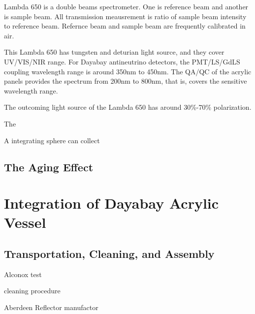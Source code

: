 Lambda 650 is a double beams spectrometer. One is reference beam and another is
sample beam. All transmission meausrement is ratio of sample beam intensity to
reference beam. Refernce beam and sample beam are frequently calibrated in air.

This Lambda 650 has tungsten and deturian light source, and they cover UV/VIS/NIR
range. For Dayabay antineutrino detectors, the PMT/LS/GdLS coupling wavelength range
is around 350nm to 450nm. The QA/QC of the acrylic panels provides the spectrum
from 200nm to 800nm, that is, covers the sensitive wavelength range.

The outcoming light source of the Lambda 650 has around 30\%-70\% polarization.

The

A integrating sphere can collect


\subsection {The Aging Effect}


\section {Integration of Dayabay Acrylic Vessel}

\subsection {Transportation, Cleaning, and Assembly}

Alconox test

cleaning procedure

Aberdeen Reflector manufactor
